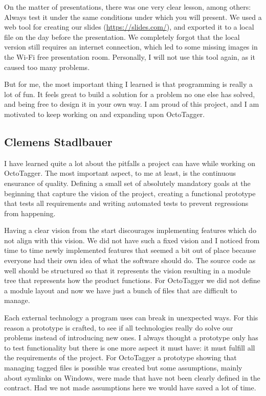On the matter of presentations, there was one very clear lesson, among others:
Always test it under the same conditions under which you will present. We used a
web tool for creating our slides (\url{https://slides.com/}), and exported it to
a local file on the day before the presentation. We completely forgot that
the local version still requires an internet connection, which led to some
missing images in the Wi-Fi free presentation room. Personally, I will not use
this tool again, as it caused too many problems.

But for me, the most important thing I learned is that programming is really a
lot of fun. It feels great to build a solution for a problem no one else has
solved, and being free to design it in your own way. I am proud of this project,
and I am motivated to keep working on and expanding upon OctoTagger.

\subsection{Clemens Stadlbauer}

I have learned quite a lot about the pitfalls a project can have while working
on OctoTagger. The most important aspect, to me at least, is the continuous
ensurance of quality. Defining a small set of absolutely mandatory goals at the
beginning that capture the vision of the project, creating a functional
prototype that tests all requirements and writing automated tests to prevent
regressions from happening.

Having a clear vision from the start discourages implementing features which do
not align with this vision. We did not have such a fixed vision and I noticed
from time to time newly implemented features that seemed a bit out of place
because everyone had their own idea of what the software should do. The source
code as well should be structured so that it represents the vision resulting
in a module tree that represents how the product functions. For OctoTagger we
did not define a module layout and now we have just a bunch of files that are
difficult to manage.

Each external technology a program uses can break in unexpected ways. For this
reason a prototype is crafted, to see if all technologies really do solve our
problems instead of introducing new ones. I always thought a prototype only has
to test functionality but there is one more aspect it must have: it must fulfill
all the requirements of the project. For OctoTagger a prototype showing that
managing tagged files is possible was created but some assumptions, mainly about
symlinks on Windows, were made that have not been clearly defined in the
contract. Had we not made assumptions here we would have saved a lot of time.

